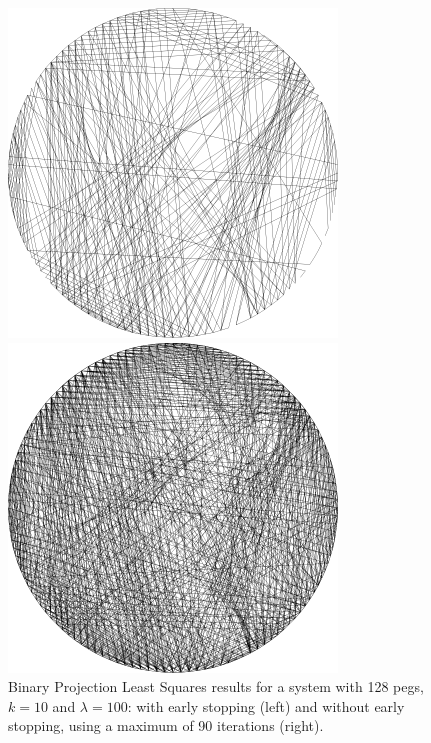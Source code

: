 \begin{figure}[H]
    \centering
    \begin{minipage}{0.2\linewidth}
        \centering
        \includegraphics[width=\linewidth]{images/bpls/bpls_earlystopping.png}
    \end{minipage}
    \begin{minipage}{0.2\linewidth}
        \centering
        \includegraphics[width=\linewidth]{images/bpls/bpls.png}
    \end{minipage}
    \caption{Binary Projection Least Squares results for a system with 128 pegs, \(k=10\) and \(\lambda=100\): with early stopping (left) and without early stopping, using a maximum of 90 iterations (right).}
    \label{fig:bpls_output}
\end{figure}


